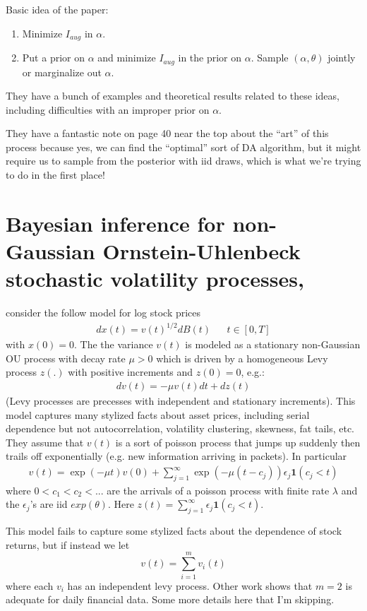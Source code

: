 \documentclass{article}\usepackage[]{graphicx}\usepackage[]{color}
\begin{document}
Basic idea of the paper:
\begin{enumerate}
  \item Minimize $I_{aug}$ in $\alpha$.
  \item Put a prior on $\alpha$ and minimize $I_{aug}$ in the prior on $\alpha$. Sample $(\alpha,\theta)$ jointly or marginalize out $\alpha$.
\end{enumerate}

They have a bunch of examples and theoretical results related to these ideas, including difficulties with an improper prior on $\alpha$.

They have a fantastic note on page 40 near the top about the ``art'' of this process because yes, we can find the ``optimal'' sort of DA algorithm, but it might require us to sample from the posterior with iid draws, which is what we're trying to do in the first place!

\section{Bayesian inference for non-Gaussian Ornstein-Uhlenbeck stochastic volatility processes, \citet{roberts2004bayesian}}
consider the follow model for log stock prices
\begin{align*}
  dx(t) = v(t)^{1/2}dB(t) && t\in [0,T]
\end{align*}
with $x(0)=0$. The the variance $v(t)$ is modeled as a stationary non-Gaussian OU process with decay rate $\mu>0$ which is driven by a homogeneous Levy process $z(.)$ with positive increments and $z(0)=0$, e.g.:
\begin{align*}
  dv(t) = -\mu v(t) dt + dz(t)
\end{align*}
(Levy processes are precesses with independent and stationary increments). This model captures many stylized facts about asset prices, including serial dependence but not autocorrelation, volatility clustering, skewness, fat tails, etc. They assume that $v(t)$ is a sort of poisson process that jumps up suddenly then trails off exponentially (e.g. new information arriving in packets). In particular
\begin{align*}
  v(t) = \exp(-\mu t) v(0) + \sum_{j=1}^\infty \exp(-\mu(t-c_j))\epsilon_j\bm{1}(c_j < t)
\end{align*}
where $0<c_1<c_2<...$ are the arrivals of a poisson process with finite rate $\lambda$ and the $\epsilon_j$'s are iid $exp(\theta)$. Here $z(t) = \sum_{j=1}^\infty \epsilon_j\bm{1}(c_j < t)$. 

This model fails to capture some stylized facts about the dependence of stock returns, but if instead we let
\[
v(t) = \sum_{i=1}^m v_i(t)
\]
where each $v_i$ has an independent levy process. Other work shows that $m=2$ is adequate for daily financial data. Some more details here that I'm skipping.
\end{document}
